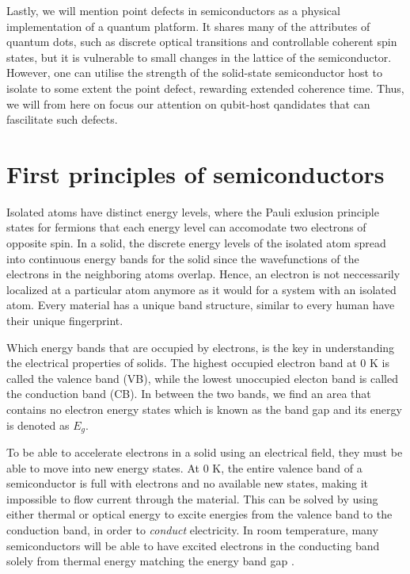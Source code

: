 Lastly, we will mention point defects in semiconductors as a physical implementation of a quantum platform. It shares many of the attributes of quantum dots, such as discrete optical transitions and controllable coherent spin states, but it is vulnerable to small changes in the lattice of the semiconductor. However, one can utilise the strength of the solid-state semiconductor host to isolate to some extent the point defect, rewarding extended coherence time. Thus, we will from here on focus our attention on qubit-host qandidates that can fascilitate such defects.


\clearpage
\section{First principles of semiconductors}

Isolated atoms have distinct energy levels, where the Pauli exlusion principle \cite{Pauli1925} states for fermions that each energy level can accomodate two electrons of opposite spin. In a solid, the discrete energy levels of the isolated atom spread into continuous energy bands for the solid since the wavefunctions of the electrons in the neighboring atoms overlap. Hence, an electron is not neccessarily localized at a particular atom anymore as it would for a system with an isolated atom. Every material has a unique band structure, similar to every human have their unique fingerprint.



Which energy bands that are occupied by electrons, is the key in understanding the electrical properties of solids. The highest occupied electron band at $0$ K is called the valence band (VB), while the lowest unoccupied electon band is called the conduction band (CB). In between the two bands, we find an area that contains no electron energy states which is known as the band gap and its energy is denoted as $E_g$.

To be able to accelerate electrons in a solid using an electrical field, they must be able to move into new energy states. At $0$ K, the entire valence band of a semiconductor is full with electrons and no available new states, making it impossible to flow current through the material. This can be solved by using either thermal or optical energy to excite energies from the valence band to the conduction band, in order to \textit{conduct} electricity. In room temperature, many semiconductors will be able to have excited electrons in the conducting band solely from thermal energy matching the energy band gap \cite{BenStreetman2015}.

